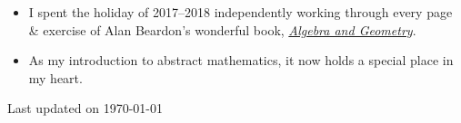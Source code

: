 \documentclass[10pt,a4paper,ragged2e,withhyper]{altacv}
\newcommand{\updateinfo}[1][\today]{\par\vfill\hfill{\scriptsize\color{LightGrey}Last updated on #1}}
\begin{document}
\begin{paracol}{2}
\begin{itemize}
\item I spent the holiday of 2017--2018 independently working through every page \& exercise of
	Alan Beardon's wonderful book,
	\href{https://www.cambridge.org/za/universitypress/subjects/mathematics/algebra/algebra-and-geometry}%
	{\emph{Algebra and Geometry}}.
\item As my introduction to abstract mathematics, it now holds a special place in my heart.
\end{itemize}
\end{paracol}
\updateinfo
\end{document}
